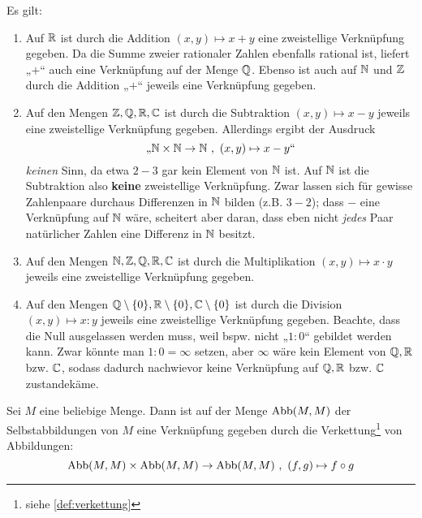 \begin{bsp}[Grundrechenarten]
    Es gilt:
    \begin{enumerate}
        \item Auf $\mathbb R$ ist durch die Addition $(x,y)\mapsto x+y$ eine zweistellige Verknüpfung gegeben. Da die Summe zweier rationaler Zahlen ebenfalls rational ist, liefert „$+$“ auch eine Verknüpfung auf der Menge $\mathbb Q$. Ebenso ist auch auf $\mathbb N$ und $\mathbb Z$ durch die Addition „$+$“ jeweils eine Verknüpfung gegeben.
        \item Auf den Mengen $\mathbb Z,\mathbb Q,\mathbb R,\mathbb C$ ist durch die Subtraktion $(x,y)\mapsto x-y$ jeweils eine zweistellige Verknüpfung gegeben. Allerdings ergibt der Ausdruck
        \[ \text{„$\N \times \N \to \N \ ,\ (x,y) \mapsto x-y$“} \]
        \emph{keinen} Sinn, da etwa $2-3$ gar kein Element von $\mathbb N$ ist. Auf $\mathbb N$ ist die Subtraktion also \textbf{keine} zweistellige Verknüpfung. Zwar lassen sich für gewisse Zahlenpaare durchaus Differenzen in $\mathbb N$ bilden (z.B. $3-2$); dass $-$ eine Verknüpfung auf $\mathbb N$ wäre, scheitert aber daran, dass eben nicht \emph{jedes} Paar natürlicher Zahlen eine Differenz in $\mathbb N$ besitzt.
        \item Auf den Mengen $\mathbb N,\mathbb Z,\mathbb Q,\mathbb R,\mathbb C$ ist durch die Multiplikation $(x,y)\mapsto x\cdot y$ jeweils eine zweistellige Verknüpfung gegeben.
        \item Auf den Mengen $\mathbb Q\setminus \{0\},\mathbb R\setminus \{0\},\mathbb C\setminus \{0\}$ ist durch die Division $(x,y)\mapsto x:y$ jeweils eine zweistellige Verknüpfung gegeben. Beachte, dass die Null ausgelassen werden muss, weil bspw. nicht „$1:0$“ gebildet werden kann. Zwar könnte man $1:0=\infty$ setzen, aber $\infty$ wäre kein Element von $\mathbb Q,\mathbb R$ bzw. $\mathbb C$, sodass dadurch nachwievor keine Verknüpfung auf $\mathbb Q,\mathbb R$ bzw. $\mathbb C$ zustandekäme.
    \end{enumerate}
\end{bsp}


\begin{bsp}
    Sei $M$ eine beliebige Menge. Dann ist auf der Menge $\operatorname{Abb}(M,M)$ der Selbstabbildungen von $M$ eine Verknüpfung gegeben durch die Verkettung\footnote{siehe \cref{def:verkettung}} von Abbildungen:
        \[ \operatorname{Abb}(M,M)\times \operatorname{Abb}(M,M)\to \operatorname{Abb}(M,M) \ ,\ (f,g)\mapsto f\circ g \]
\end{bsp}


